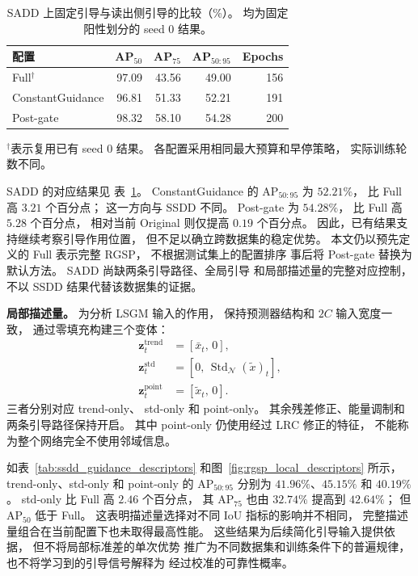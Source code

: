 \documentclass[journal]{IEEEtran}
\begin{document}
\begin{table}[!t]
\centering
\small
\setlength{\tabcolsep}{3pt}
\caption{SADD 上固定引导与读出侧引导的比较（\%）。
均为固定阳性划分的 seed 0 结果。}
\label{tab:sadd_guidance_variants}
\begin{tabular}{lrrrr}
\toprule
配置 & AP$_{50}$ & AP$_{75}$
& AP$_{50:95}$ & Epochs \\
\midrule
Full$^{\dagger}$
& 97.09 & 43.56 & 49.00 & 156 \\
ConstantGuidance
& 96.81 & 51.33 & 52.21 & 191 \\
Post-gate
& 98.32 & 58.10 & 54.28 & 200 \\
\bottomrule
\end{tabular}
\smallskip
\begin{minipage}{\linewidth}
\footnotesize
$^{\dagger}$表示复用已有 seed 0 结果。
各配置采用相同最大预算和早停策略，
实际训练轮数不同。
\end{minipage}
\end{table}

SADD 的对应结果见
表~\ref{tab:sadd_guidance_variants}。
ConstantGuidance 的 $\mathrm{AP}_{50:95}$
为 $52.21\%$，
比 Full 高 $3.21$ 个百分点；
这一方向与 SSDD 不同。
Post-gate 为 $54.28\%$，
比 Full 高 $5.28$ 个百分点，
相对当前 Original 则仅提高 $0.19$ 个百分点。
因此，已有结果支持继续考察引导作用位置，
但不足以确立跨数据集的稳定优势。
本文仍以预先定义的 Full 表示完整 RGSP，
不根据测试集上的配置排序
事后将 Post-gate 替换为默认方法。
SADD 尚缺两条引导路径、全局引导
和局部描述量的完整对应控制，
不以 SSDD 结果代替该数据集的证据。

\textbf{局部描述量。}
为分析 LSGM 输入的作用，
保持预测器结构和 $2C$ 输入宽度一致，
通过零填充构建三个变体：
\begin{equation}
\begin{aligned}
\mathbf{z}_t^{\mathrm{trend}}
&=[\bar{x}_t,\,0],\\
\mathbf{z}_t^{\mathrm{std}}
&=[0,\,\operatorname{Std}_{\mathcal{N}}
(\widetilde{x})_t],\\
\mathbf{z}_t^{\mathrm{point}}
&=[\widetilde{x}_t,\,0].
\end{aligned}
\label{eq:ablation_descriptor_inputs}
\end{equation}
三者分别对应 trend-only、
std-only 和 point-only。
其余残差修正、能量调制和两条引导路径保持开启。
其中 point-only 仍使用经过 LRC 修正的特征，
不能称为整个网络完全不使用邻域信息。

如表~\ref{tab:ssdd_guidance_descriptors}
和图~\ref{fig:rgsp_local_descriptors} 所示，
trend-only、std-only 和 point-only 的
$\mathrm{AP}_{50:95}$ 分别为
$41.96\%$、$45.15\%$ 和 $40.19\%$。
std-only 比 Full 高 $2.46$ 个百分点，
其 $\mathrm{AP}_{75}$ 也由 $32.74\%$
提高到 $42.64\%$；
但 $\mathrm{AP}_{50}$ 低于 Full。
这表明描述量选择对不同 IoU 指标的影响并不相同，
完整描述量组合在当前配置下也未取得最高性能。
这些结果为后续简化引导输入提供依据，
但不将局部标准差的单次优势
推广为不同数据集和训练条件下的普遍规律，
也不将学习到的引导信号解释为
经过校准的可靠性概率。
\end{document}
